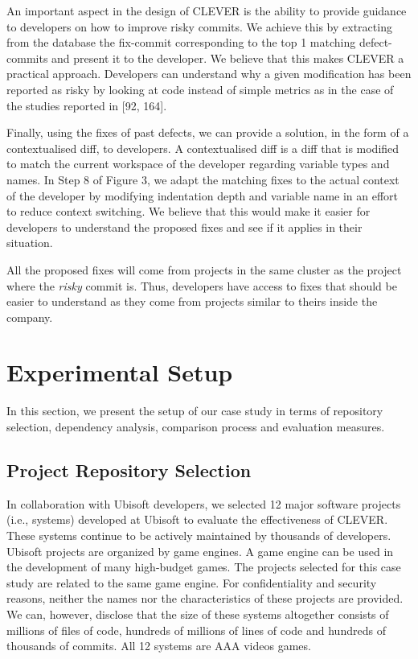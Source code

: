 \documentclass[12pt]{report}
\begin{document}
An important aspect in the design of CLEVER is the ability to provide
guidance to developers on how to improve risky commits. We achieve this
by extracting from the database the fix-commit corresponding to the top
1 matching defect-commits and present it to the developer. We believe
that this makes CLEVER a practical approach. Developers can understand
why a given modification has been reported as risky by looking at code
instead of simple metrics as in the case of the studies reported in
{[}92, 164{]}.

Finally, using the fixes of past defects, we can provide a solution, in
the form of a contextualised diff, to developers. A contextualised diff
is a diff that is modified to match the current workspace of the
developer regarding variable types and names. In Step 8 of Figure 3, we
adapt the matching fixes to the actual context of the developer by
modifying indentation depth and variable name in an effort to reduce
context switching. We believe that this would make it easier for
developers to understand the proposed fixes and see if it applies in
their situation.

All the proposed fixes will come from projects in the same cluster as
the project where the \emph{risky} commit is. Thus, developers have
access to fixes that should be easier to understand as they come from
projects similar to theirs inside the company.

\section{Experimental Setup}\label{sec:exp}

In this section, we present the setup of our case study in terms of
repository selection, dependency analysis, comparison process and
evaluation measures.

\subsection{Project Repository Selection}\label{sec:rep}

In collaboration with Ubisoft developers, we selected 12 major software
projects (i.e., systems) developed at Ubisoft to evaluate the
effectiveness of CLEVER. These systems continue to be actively
maintained by thousands of developers. Ubisoft projects are organized by
game engines. A game engine can be used in the development of many
high-budget games. The projects selected for this case study are related
to the same game engine. For confidentiality and security reasons,
neither the names nor the characteristics of these projects are
provided. We can, however, disclose that the size of these systems
altogether consists of millions of files of code, hundreds of millions
of lines of code and hundreds of thousands of commits. All 12 systems
are AAA videos games.
\end{document}
